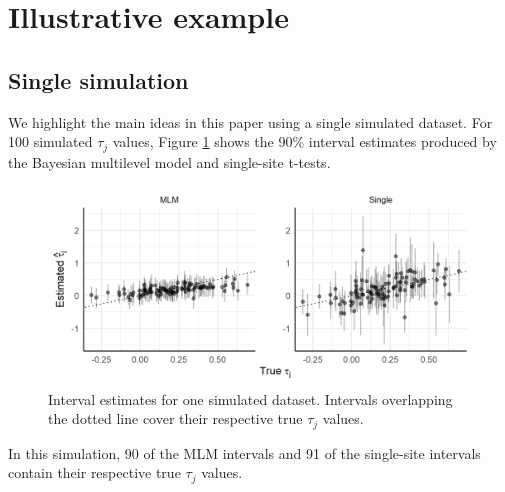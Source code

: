 \documentclass[]{article}
\begin{document}
\section{Illustrative example}

\subsection{Single simulation}

We highlight the main ideas in this paper using a single simulated dataset.
For 100 simulated $\tau_j$ values, Figure \ref{fig:shrinkageplot} shows the 90\% interval estimates produced by the Bayesian multilevel model and single-site t-tests.
\begin{figure}[ht]
	\centering
	\includegraphics[width=\textwidth]{shrinkageplot}
	\caption{Interval estimates for one simulated dataset. Intervals overlapping the dotted line cover their respective true $\tau_j$ values.}
	\label{fig:shrinkageplot}
\end{figure}
In this simulation, 90 of the MLM intervals and 91 of the single-site intervals contain their respective true $\tau_j$ values.
\end{document}
